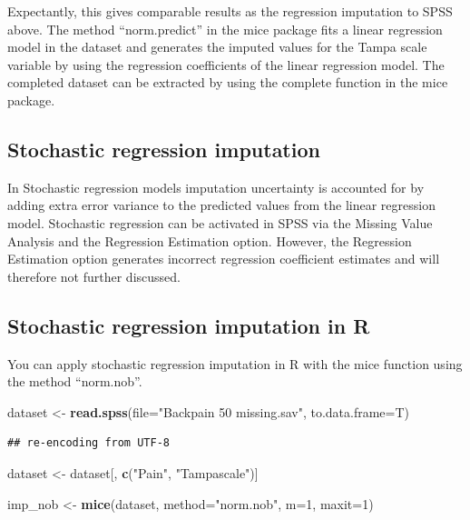 \documentclass[]{book}
\newenvironment{Shaded}{\begin{snugshade}}{\end{snugshade}}
\newcommand{\KeywordTok}[1]{\textcolor[rgb]{0.13,0.29,0.53}{\textbf{#1}}}
\newcommand{\DataTypeTok}[1]{\textcolor[rgb]{0.13,0.29,0.53}{#1}}
\newcommand{\DecValTok}[1]{\textcolor[rgb]{0.00,0.00,0.81}{#1}}
\newcommand{\StringTok}[1]{\textcolor[rgb]{0.31,0.60,0.02}{#1}}
\newcommand{\NormalTok}[1]{#1}
\begin{document}
Expectantly, this gives comparable results as the regression imputation
to SPSS above. The method ``norm.predict'' in the mice package fits a
linear regression model in the dataset and generates the imputed values
for the Tampa scale variable by using the regression coefficients of the
linear regression model. The completed dataset can be extracted by using
the complete function in the mice package.

\subsection{Stochastic regression
imputation}\label{stochastic-regression-imputation}

In Stochastic regression models imputation uncertainty is accounted for
by adding extra error variance to the predicted values from the linear
regression model. Stochastic regression can be activated in SPSS via the
Missing Value Analysis and the Regression Estimation option. However,
the Regression Estimation option generates incorrect regression
coefficient estimates \citep{hippel2004} and will therefore not further
discussed.

\subsection{Stochastic regression imputation in
R}\label{stochastic-regression-imputation-in-r}

You can apply stochastic regression imputation in R with the mice
function using the method ``norm.nob''.

\begin{Shaded}
\begin{Highlighting}[]
\NormalTok{dataset <-}\StringTok{ }\KeywordTok{read.spss}\NormalTok{(}\DataTypeTok{file=}\StringTok{"Backpain 50 missing.sav"}\NormalTok{, }\DataTypeTok{to.data.frame=}\NormalTok{T)}
\end{Highlighting}
\end{Shaded}

\begin{verbatim}
## re-encoding from UTF-8
\end{verbatim}

\begin{Shaded}
\begin{Highlighting}[]
\NormalTok{dataset <-}\StringTok{ }\NormalTok{dataset[, }\KeywordTok{c}\NormalTok{(}\StringTok{"Pain"}\NormalTok{, }\StringTok{"Tampascale"}\NormalTok{)]}

\NormalTok{imp_nob <-}\StringTok{ }\KeywordTok{mice}\NormalTok{(dataset, }\DataTypeTok{method=}\StringTok{"norm.nob"}\NormalTok{, }\DataTypeTok{m=}\DecValTok{1}\NormalTok{, }\DataTypeTok{maxit=}\DecValTok{1}\NormalTok{)}
\end{Highlighting}
\end{Shaded}
\end{document}

